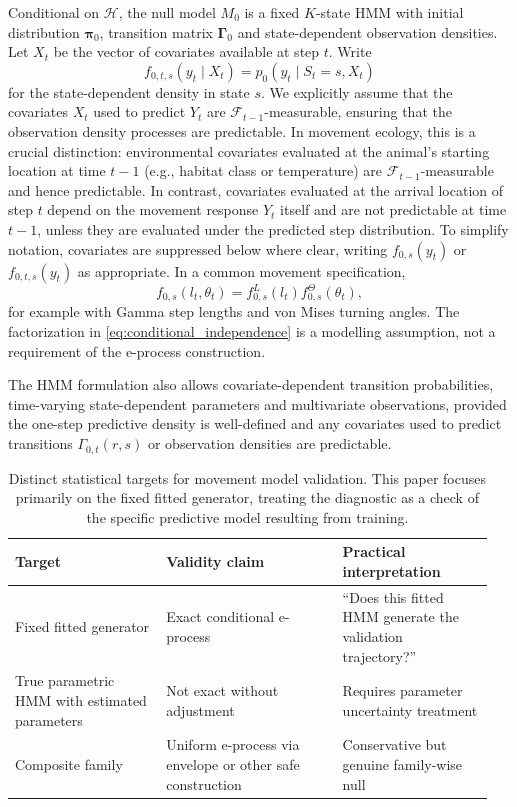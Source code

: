 \documentclass[pdflatex,sn-basic]{sn-jnl}
\theoremstyle{thmstyleone}
\theoremstyle{thmstyletwo}
\theoremstyle{thmstylethree}
\newcommand{\1}{\mathbf 1}
\newcommand{\calF}{\mathcal F}
\newcommand{\calH}{\mathcal H}
\begin{document}
Conditional on $\calH$, the null model $M_0$ is a fixed $K$-state HMM with initial distribution $\boldsymbol\pi_0$, transition matrix $\boldsymbol\Gamma_0$ and state-dependent observation densities. Let $X_t$ be the vector of covariates available at step $t$. Write
\begin{equation}
 f_{0,t,s}(y_t\mid X_t)=p_0(y_t\mid S_t=s, X_t)
\end{equation}
for the state-dependent density in state $s$. We explicitly assume that the covariates $X_t$ used to predict $Y_t$ are $\calF_{t-1}$-measurable, ensuring that the observation density processes are predictable. In movement ecology, this is a crucial distinction: environmental covariates evaluated at the animal's starting location at time $t-1$ (e.g., habitat class or temperature) are $\calF_{t-1}$-measurable and hence predictable. In contrast, covariates evaluated at the arrival location of step $t$ depend on the movement response $Y_t$ itself and are not predictable at time $t-1$, unless they are evaluated under the predicted step distribution. To simplify notation, covariates are suppressed below where clear, writing $f_{0,s}(y_t)$ or $f_{0,t,s}(y_t)$ as appropriate. In a common movement specification,
\begin{equation}
 f_{0,s}(l_t,\theta_t)=f^L_{0,s}(l_t)f^\Theta_{0,s}(\theta_t),
 \label{eq:conditional_independence}
\end{equation}
for example with Gamma step lengths and von Mises turning angles. The factorization in \eqref{eq:conditional_independence} is a modelling assumption, not a requirement of the e-process construction.

The HMM formulation also allows covariate-dependent transition probabilities, time-varying state-dependent parameters and multivariate observations, provided the one-step predictive density is well-defined and any covariates used to predict transitions $\Gamma_{0,t}(r,s)$ or observation densities are predictable.

\begin{table}[t]
\centering
\begin{tabular}{@{}>{\raggedright\arraybackslash}p{0.3\linewidth}>{\raggedright\arraybackslash}p{0.35\linewidth}>{\raggedright\arraybackslash}p{0.3\linewidth}@{}}
\toprule
Target & Validity claim & Practical interpretation \\
\midrule
Fixed fitted generator & Exact conditional e-process & ``Does this fitted HMM generate the validation trajectory?'' \\
True parametric HMM with estimated parameters & Not exact without adjustment & Requires parameter uncertainty treatment \\
Composite family & Uniform e-process via envelope or other safe construction & Conservative but genuine family-wise null \\
\bottomrule
\end{tabular}
\caption{Distinct statistical targets for movement model validation. This paper focuses primarily on the fixed fitted generator, treating the diagnostic as a check of the specific predictive model resulting from training.}
\label{tab:null_targets}
\end{table}
\end{document}
